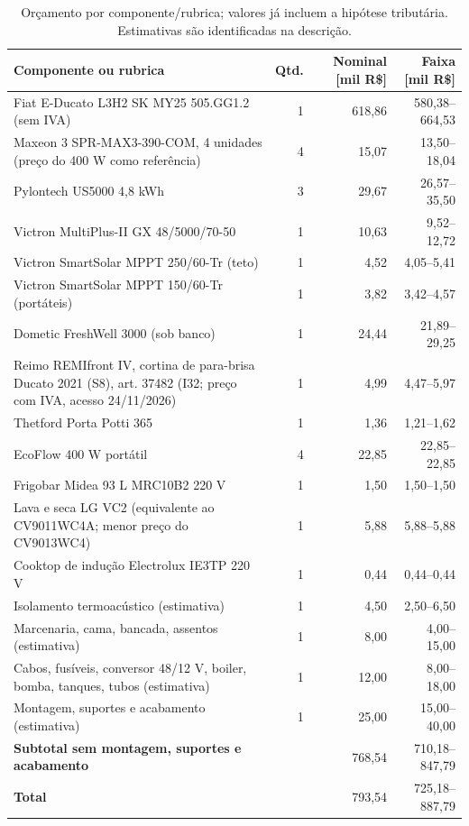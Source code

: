 \begin{table}[H]\centering\small
\caption{Orçamento por componente/rubrica; valores já incluem a hipótese tributária. Estimativas são identificadas na descrição.}\label{tab:custos}
\begin{tabularx}{\linewidth}{Xrrr}
\toprule
Componente ou rubrica & Qtd. & Nominal [mil R\$] & Faixa [mil R\$] \\
\midrule
Fiat E-Ducato L3H2 SK MY25 505.GG1.2 (sem IVA) & 1 & 618,86 & 580,38--664,53 \\
Maxeon 3 SPR-MAX3-390-COM, 4 unidades (preço do 400 W como referência) & 4 & 15,07 & 13,50--18,04 \\
Pylontech US5000 4,8 kWh & 3 & 29,67 & 26,57--35,50 \\
Victron MultiPlus-II GX 48/5000/70-50 & 1 & 10,63 & 9,52--12,72 \\
Victron SmartSolar MPPT 250/60-Tr (teto) & 1 & 4,52 & 4,05--5,41 \\
Victron SmartSolar MPPT 150/60-Tr (portáteis) & 1 & 3,82 & 3,42--4,57 \\
Dometic FreshWell 3000 (sob banco) & 1 & 24,44 & 21,89--29,25 \\
Reimo REMIfront IV, cortina de para-brisa Ducato 2021 (S8), art. 37482 (I32; preço com IVA, acesso 24/11/2026) & 1 & 4,99 & 4,47--5,97 \\
Thetford Porta Potti 365 & 1 & 1,36 & 1,21--1,62 \\
EcoFlow 400 W portátil & 4 & 22,85 & 22,85--22,85 \\
Frigobar Midea 93 L MRC10B2 220 V & 1 & 1,50 & 1,50--1,50 \\
Lava e seca LG VC2 (equivalente ao CV9011WC4A; menor preço do CV9013WC4) & 1 & 5,88 & 5,88--5,88 \\
Cooktop de indução Electrolux IE3TP 220 V & 1 & 0,44 & 0,44--0,44 \\
Isolamento termoacústico (estimativa) & 1 & 4,50 & 2,50--6,50 \\
Marcenaria, cama, bancada, assentos (estimativa) & 1 & 8,00 & 4,00--15,00 \\
Cabos, fusíveis, conversor 48/12 V, boiler, bomba, tanques, tubos (estimativa) & 1 & 12,00 & 8,00--18,00 \\
Montagem, suportes e acabamento (estimativa) & 1 & 25,00 & 15,00--40,00 \\
\textbf{Subtotal sem montagem, suportes e acabamento} &  & 768,54 & 710,18--847,79 \\
\textbf{Total} &  & 793,54 & 725,18--887,79 \\
\bottomrule
\end{tabularx}
\end{table}
